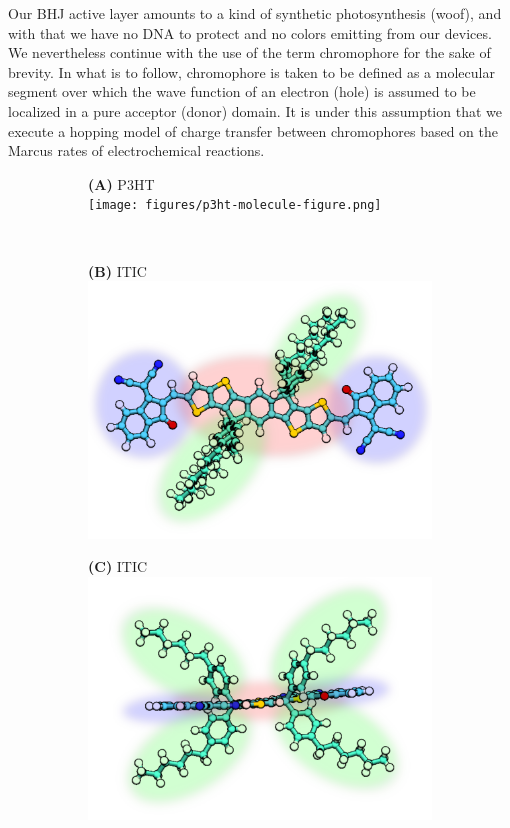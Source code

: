 Our BHJ active layer amounts to a kind of synthetic photosynthesis (woof), and with that we have no DNA to
protect and no colors emitting from our devices. We nevertheless continue with the use of the term chromophore
for the sake of brevity. In what is to follow, chromophore is taken to be defined as a molecular segment over which the 
wave function of an electron (hole) is assumed to be localized in a pure acceptor (donor) domain. 
It is under this assumption that we execute a hopping model of charge transfer between
chromophores based on the Marcus rates of electrochemical reactions.

\begin{figure}
\centering
\begin{subfigure}{.6\textwidth}
    \centering
    \textbf{(A)} P3HT \\
    \texttt{[image: figures/p3ht-molecule-figure.png]}
    \newline
\end{subfigure}%
\\
\begin{subfigure}{.3\textwidth}
    \textbf{(B)} ITIC
    \centering
    \includegraphics[width=\textwidth]{figures/itic-backbone-figure.png}
\end{subfigure}%
\begin{subfigure}{.3\textwidth}
    \textbf{(C)} ITIC
    \centering
    \includegraphics[width=\textwidth]{figures/itic-sidechain-figure.png}

\end{subfigure}
\end{figure}

